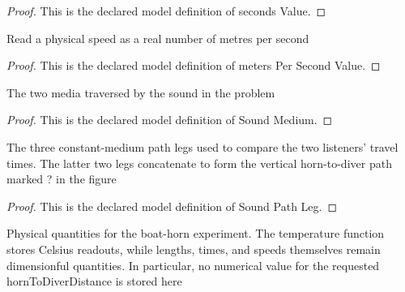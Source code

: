 \begin{proof}
  This is the declared model definition of seconds Value.
\end{proof}
\begin{definition}
  \label{def:physics:phyx-mini-0168:phyxminiproblems-problemphyxmini0168-meterspersecondvalue}
  Read a physical speed as a real number of metres per second
\end{definition}
\begin{proof}
  This is the declared model definition of meters Per Second Value.
\end{proof}
\begin{definition}
  \label{def:physics:phyx-mini-0168:phyxminiproblems-problemphyxmini0168-soundmedium}
  The two media traversed by the sound in the problem
\end{definition}
\begin{proof}
  This is the declared model definition of Sound Medium.
\end{proof}
\begin{definition}
  \label{def:physics:phyx-mini-0168:phyxminiproblems-problemphyxmini0168-soundpathleg}
  The three constant-medium path legs used to compare the two listeners' travel times. The latter two legs concatenate to form the vertical horn-to-diver path marked ? in the figure
\end{definition}
\begin{proof}
  This is the declared model definition of Sound Path Leg.
\end{proof}
\begin{definition}
  \label{def:physics:phyx-mini-0168:phyxminiproblems-problemphyxmini0168-boathorndiversetup}
  Physical quantities for the boat-horn experiment. The temperature function stores Celsius readouts, while lengths, times, and speeds themselves remain dimensionful quantities. In particular, no numerical value for the requested hornToDiverDistance is stored here
\end{definition}
